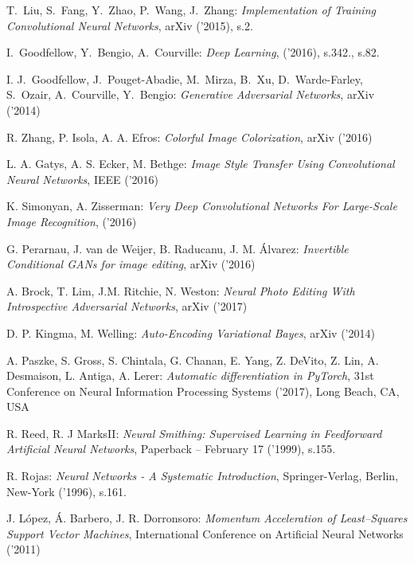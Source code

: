 \begin{thebibliography}{99} %

   T.~Liu, S.~Fang, Y.~Zhao, P.~Wang, J.~Zhang:
  \emph{Implementation of Training Convolutional Neural Networks}, arXiv ('2015), s.2.

   I.~Goodfellow, Y.~Bengio, A.~Courville:
  \emph{Deep Learning}, ('2016), s.342., s.82.

   I. J.~Goodfellow, J.~Pouget-Abadie, M.~Mirza, B.~Xu, D.~Warde-Farley, S.~Ozair, A.~Courville, Y.~Bengio:
  \emph{Generative Adversarial Networks}, arXiv ('2014)

   R. Zhang, P. Isola, A. A. Efros:
  \emph{Colorful Image Colorization}, arXiv ('2016)

   L. A. Gatys, A. S. Ecker, M. Bethge:
  \emph{Image Style Transfer Using Convolutional Neural Networks}, IEEE ('2016)

   K. Simonyan, A. Zisserman:
  \emph{Very Deep Convolutional Networks For Large-Scale Image Recognition}, ('2016)

   G. Perarnau, J. van de Weijer, B. Raducanu, J. M. Álvarez:
  \emph{Invertible Conditional GANs for image editing}, arXiv ('2016)

   A. Brock, T. Lim, J.M. Ritchie,
  N. Weston:
  \emph{Neural Photo Editing With Introspective Adversarial Networks}, arXiv ('2017)

   D. P. Kingma, M. Welling:
  \emph{Auto-Encoding Variational Bayes}, arXiv ('2014)

   A. Paszke, S. Gross, S. Chintala, G. Chanan,
  E. Yang, Z. DeVito, Z. Lin, A. Desmaison, L. Antiga, A. Lerer:
  \emph{Automatic differentiation in PyTorch}, 31st Conference on Neural Information
  Processing Systems ('2017), Long Beach, CA, USA

    R. Reed,  R. J MarksII:
  \emph{Neural Smithing: Supervised Learning in Feedforward Artificial Neural Networks},
  Paperback – February 17 ('1999), s.155.

   R. Rojas:
  \emph{Neural Networks - A Systematic Introduction},
  Springer-Verlag, Berlin, New-York ('1996), s.161.

   J. López, Á. Barbero, J. R. Dorronsoro:
  \emph{Momentum Acceleration of Least–Squares Support Vector Machines},
  International Conference on Artificial Neural Networks ('2011)


\end{thebibliography}
